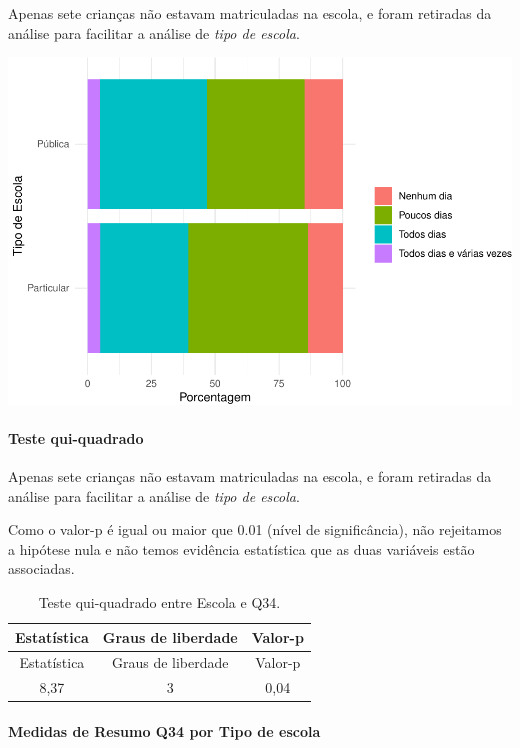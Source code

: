 \documentclass[]{article}
\let\oldparagraph\paragraph
\renewcommand{\paragraph}[1]{\oldparagraph{#1}\mbox{}}
\begin{document}
Apenas sete crianças não estavam matriculadas na escola, e foram retiradas da análise para facilitar a análise de \emph{tipo de escola}.

\begin{center}\includegraphics[width=0.75\linewidth]{relatorio_covid19_files/figure-latex/unnamed-chunk-1233-1} \end{center}

\hypertarget{teste-qui-quadrado-106}{%
\paragraph{Teste qui-quadrado}\label{teste-qui-quadrado-106}}

Apenas sete crianças não estavam matriculadas na escola, e foram retiradas da análise para facilitar a análise de \emph{tipo de escola}.

Como o valor-p é igual ou maior que 0.01 (nível de significância), não rejeitamos a hipótese nula e não temos evidência estatística que as duas variáveis estão associadas.

\begin{longtable}[]{@{}ccc@{}}
\caption{\label{tab:unnamed-chunk-1235}Teste qui-quadrado entre Escola e Q34.}\tabularnewline
\toprule
Estatística & Graus de liberdade & Valor-p\tabularnewline
\midrule
\endfirsthead
\toprule
Estatística & Graus de liberdade & Valor-p\tabularnewline
\midrule
\endhead
8,37 & 3 & 0,04\tabularnewline
\bottomrule
\end{longtable}

\cleardoublepage

\hypertarget{medidas-de-resumo-q34-por-tipo-de-escola}{%
\paragraph{Medidas de Resumo Q34 por Tipo de escola}\label{medidas-de-resumo-q34-por-tipo-de-escola}}
\end{document}
